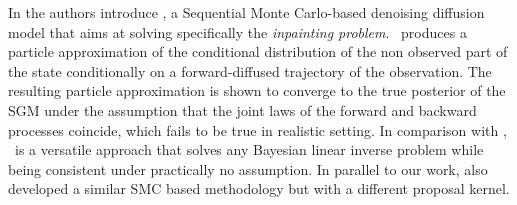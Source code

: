 In \cite{trippe2023diffusion} the authors introduce \smcdiff, a Sequential Monte Carlo-based denoising diffusion model that aims at solving specifically the \emph{inpainting problem}. \smcdiff\ produces a particle approximation of the conditional distribution of the non observed part of the state conditionally on a forward-diffused trajectory of the observation. The resulting particle approximation is shown to converge to the true posterior of the SGM under the assumption that the joint laws of the forward and backward processes coincide, which fails to be true in realistic setting.
In comparison with \smcdiff, \algo\ is a versatile approach that solves any Bayesian linear inverse problem while being consistent under practically no assumption. In parallel to our work, \cite{wu2023practical} also developed a similar SMC based methodology but with a different proposal kernel.